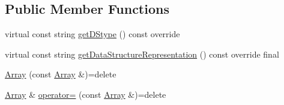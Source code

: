 \subsection*{Public Member Functions}
\begin{DoxyCompactItemize}
\item 
virtual const string \hyperlink{classbridges_1_1datastructure_1_1_array_a3b6d694fe5d336a0a15951d522852e51}{get\+D\+Stype} () const override
\item 
virtual const string \hyperlink{classbridges_1_1datastructure_1_1_array_a210de6729fa08715c13d2deb0b141010}{get\+Data\+Structure\+Representation} () const override final
\item 
\hyperlink{classbridges_1_1datastructure_1_1_array_abd017f8feb1d892e8559df6533354d3f}{Array} (const \hyperlink{classbridges_1_1datastructure_1_1_array}{Array} \&)=delete
\item 
\hyperlink{classbridges_1_1datastructure_1_1_array}{Array} \& \hyperlink{classbridges_1_1datastructure_1_1_array_a5ca19edaaf0eeba81f73440384eddeb4}{operator=} (const \hyperlink{classbridges_1_1datastructure_1_1_array}{Array} \&)=delete
\end{DoxyCompactItemize}
